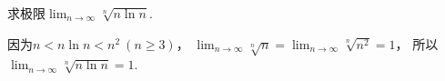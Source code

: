 \begin{example}
求极限\(\lim_{n\to\infty} \sqrt[n]{n \ln n}\).
\begin{solution}
因为\(n < n \ln n < n^2\ (n\geq3)\)，
\(\lim_{n\to\infty} \sqrt[n]{n}
= \lim_{n\to\infty} \sqrt[n]{n^2} = 1\)，
所以\(\lim_{n\to\infty} \sqrt[n]{n \ln n} = 1\).
\end{solution}
\end{example}
